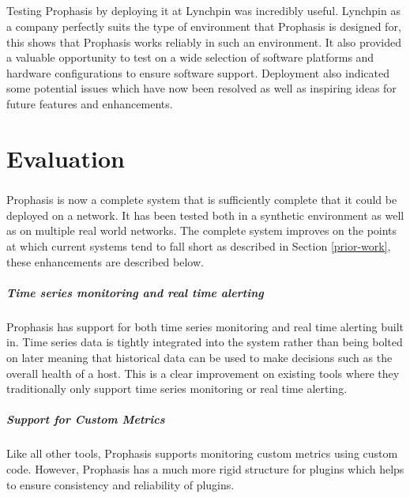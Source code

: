 \documentclass[bsc,logo,twoside,singlespacing,notimes]{infthesis}
\begin{document}
\paragraph*{}
	Testing Prophasis by deploying it at Lynchpin was incredibly useful. Lynchpin
	as a company perfectly suits the type of environment that Prophasis is designed
	for, this shows that Prophasis works reliably in such an environment.  It also
	provided a valuable opportunity to test on a wide selection of software
	platforms and hardware configurations to ensure software support.  Deployment
	also indicated some potential issues which have now been resolved as well as
	inspiring ideas for future features and enhancements.

\chapter{Evaluation}
\paragraph*{}
	Prophasis is now a complete system that is sufficiently complete that it could
	be deployed on a network.  It has been tested both in a synthetic environment
	as well as on multiple real world networks.  The complete system improves on
	the points at which current systems tend to fall short as described in Section
	\ref{prior-work}, these enhancements are described below.
	
\paragraph*{Time series monitoring and real time alerting}
	Prophasis has support for both time series monitoring and real time alerting
	built in.  Time series data is tightly integrated into the system rather than
	being bolted on later meaning that historical data can be used to make
	decisions such as the overall health of a host.  This is a clear improvement
	on existing tools where they traditionally only support time series monitoring
	or real time alerting.

\paragraph*{Support for Custom Metrics}
	Like all other tools, Prophasis supports monitoring custom metrics using custom
	code.  However, Prophasis has a much more rigid structure for plugins which
	helps to ensure consistency and reliability of plugins.
\end{document}
